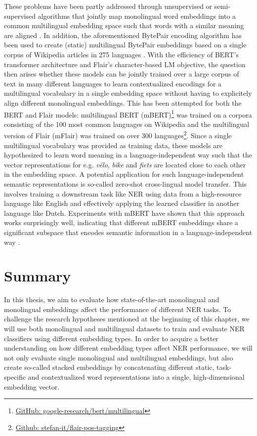 \documentclass[12pt,a4paper,]{book}
\begin{document}
These problems have been partly addressed through unsupervised or semi-supervised algorithms that jointly map monolingual word embeddings into a common multilingual embedding space such that words with a similar meaning are aligned \citep{artetxe2018, lample2018}. In addition, the aforementioned BytePair encoding algorithm has been used to create (static) multilingual BytePair embeddings based on a single corpus of Wikipedia articles in 275 languages \citep{heinzerling2017}. With the efficiency of BERT's transformer architecture and Flair's character-based LM objective, the question then arises whether these models can be jointly trained over a large corpus of text in many different languages to learn contextualized encodings for a multilingual vocabulary in a single embedding space without having to explicitely align different monolingual embeddings. This has been attempted for both the BERT and Flair models: multilingual BERT (mBERT)\footnote{\href{https://github.com/google-research/bert/blob/master/multilingual.md}{GitHub: google-research/bert/multilingual}} was trained on a corpora consisting of the 100 most common languages on Wikipedia and the multilingual version of Flair (mFlair) was trained on over 300 languages\footnote{\href{https://github.com/stefan-it/flair-pos-tagging}{Github: stefan-it/flair-pos-tagging}}. Since a single multilingual vocabulary was provided as training data, these models are hypothesized to learn word meaning in a language-independent way such that the vector representations for e.g. \emph{vélo}, \emph{bike} and \emph{fiets} are located close to each other in the embedding space. A potential application for such language-independent semantic representations is so-called zero-shot cross-lingual model transfer. This involves training a downstream task like NER using data from a high-resource language like English and effectively applying the learned classifier in another language like Dutch. Experiments with mBERT have shown that this approach works surprisingly well, indicating that different mBERT embeddings share a significant subspace that encodes semantic information in a language-independent way \citep{pires2019}.

\hypertarget{summary}{%
\section{Summary}\label{summary}}

In this thesis, we aim to evaluate how state-of-the-art monolingual and monolingual embeddings affect the performance of different NER tasks. To challenge the research hypotheses mentioned at the beginning of this chapter, we will use both monolingual and multilingual datasets to train and evaluate NER classifiers using different embedding types. In order to acquire a better understanding on how different embedding types affect NER performance, we will not only evaluate single monolingual and multilingual embeddings, but also create so-called stacked embeddings by concatenating different static, task-specific and contextualized word representations into a single, high-dimensional embedding vector.
\end{document}
